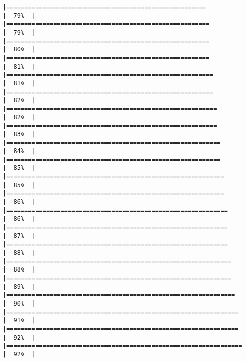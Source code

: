 \documentclass[
]{article}
\begin{document}
\begin{verbatim}
|=======================================================               |  79%  |                                                                              |========================================================              |  79%  |                                                                              |========================================================              |  80%  |                                                                              |========================================================              |  81%  |                                                                              |=========================================================             |  81%  |                                                                              |=========================================================             |  82%  |                                                                              |==========================================================            |  82%  |                                                                              |==========================================================            |  83%  |                                                                              |===========================================================           |  84%  |                                                                              |===========================================================           |  85%  |                                                                              |============================================================          |  85%  |                                                                              |============================================================          |  86%  |                                                                              |=============================================================         |  86%  |                                                                              |=============================================================         |  87%  |                                                                              |=============================================================         |  88%  |                                                                              |==============================================================        |  88%  |                                                                              |==============================================================        |  89%  |                                                                              |===============================================================       |  90%  |                                                                              |================================================================      |  91%  |                                                                              |================================================================      |  92%  |                                                                              |=================================================================     |  92%  |                                                                              
\end{verbatim}
\end{document}
